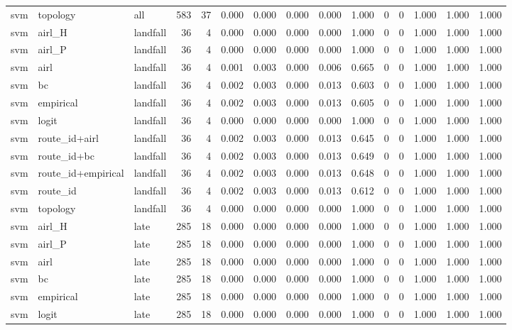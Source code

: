 \begin{tabular}{lllrrrrrrrrrrrr}
svm & topology & all & 583 & 37 & 0.000 & 0.000 & 0.000 & 0.000 & 1.000 & 0 & 0 & 1.000 & 1.000 & 1.000 \\
svm & airl_H & landfall & 36 & 4 & 0.000 & 0.000 & 0.000 & 0.000 & 1.000 & 0 & 0 & 1.000 & 1.000 & 1.000 \\
svm & airl_P & landfall & 36 & 4 & 0.000 & 0.000 & 0.000 & 0.000 & 1.000 & 0 & 0 & 1.000 & 1.000 & 1.000 \\
svm & airl & landfall & 36 & 4 & 0.001 & 0.003 & 0.000 & 0.006 & 0.665 & 0 & 0 & 1.000 & 1.000 & 1.000 \\
svm & bc & landfall & 36 & 4 & 0.002 & 0.003 & 0.000 & 0.013 & 0.603 & 0 & 0 & 1.000 & 1.000 & 1.000 \\
svm & empirical & landfall & 36 & 4 & 0.002 & 0.003 & 0.000 & 0.013 & 0.605 & 0 & 0 & 1.000 & 1.000 & 1.000 \\
svm & logit & landfall & 36 & 4 & 0.000 & 0.000 & 0.000 & 0.000 & 1.000 & 0 & 0 & 1.000 & 1.000 & 1.000 \\
svm & route_id+airl & landfall & 36 & 4 & 0.002 & 0.003 & 0.000 & 0.013 & 0.645 & 0 & 0 & 1.000 & 1.000 & 1.000 \\
svm & route_id+bc & landfall & 36 & 4 & 0.002 & 0.003 & 0.000 & 0.013 & 0.649 & 0 & 0 & 1.000 & 1.000 & 1.000 \\
svm & route_id+empirical & landfall & 36 & 4 & 0.002 & 0.003 & 0.000 & 0.013 & 0.648 & 0 & 0 & 1.000 & 1.000 & 1.000 \\
svm & route_id & landfall & 36 & 4 & 0.002 & 0.003 & 0.000 & 0.013 & 0.612 & 0 & 0 & 1.000 & 1.000 & 1.000 \\
svm & topology & landfall & 36 & 4 & 0.000 & 0.000 & 0.000 & 0.000 & 1.000 & 0 & 0 & 1.000 & 1.000 & 1.000 \\
svm & airl_H & late & 285 & 18 & 0.000 & 0.000 & 0.000 & 0.000 & 1.000 & 0 & 0 & 1.000 & 1.000 & 1.000 \\
svm & airl_P & late & 285 & 18 & 0.000 & 0.000 & 0.000 & 0.000 & 1.000 & 0 & 0 & 1.000 & 1.000 & 1.000 \\
svm & airl & late & 285 & 18 & 0.000 & 0.000 & 0.000 & 0.000 & 1.000 & 0 & 0 & 1.000 & 1.000 & 1.000 \\
svm & bc & late & 285 & 18 & 0.000 & 0.000 & 0.000 & 0.000 & 1.000 & 0 & 0 & 1.000 & 1.000 & 1.000 \\
svm & empirical & late & 285 & 18 & 0.000 & 0.000 & 0.000 & 0.000 & 1.000 & 0 & 0 & 1.000 & 1.000 & 1.000 \\
svm & logit & late & 285 & 18 & 0.000 & 0.000 & 0.000 & 0.000 & 1.000 & 0 & 0 & 1.000 & 1.000 & 1.000 \\

\end{tabular}
